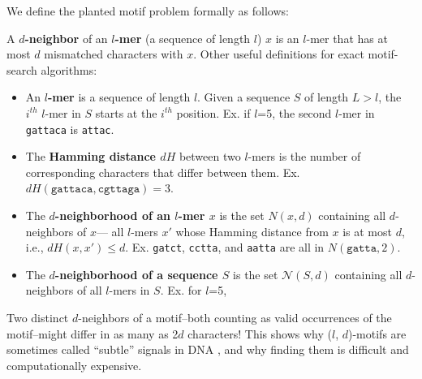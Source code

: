\documentclass{acm_proc_article-sp}
\begin{document}
	We define the planted motif problem formally as follows:

	\noindent

	A {\boldmath \textbf{$d$-neighbor} of an \textbf{$l$-mer}} (a sequence of length $l$) $x$ is an $l$-mer that has at most $d$ mismatched characters with $x$.  Other useful definitions for exact motif-search algorithms:
		\vspace{-3mm}
		\begin{itemize}
			\small
			\item An \textbf{\boldmath $l$-mer} is a sequence of length $l$.
			Given a sequence $S$ of length $L > l$, the $i^{th}$ $l$-mer in $S$ starts at the $i^{th}$ position.
			Ex. if $l$=5, the second $l$-mer in \texttt{gattaca} is \texttt{attac}.
	
			\item The \textbf{\boldmath Hamming distance $dH$} 
			between two $l$-mers is the number of corresponding characters that differ between them.
			Ex. $dH(\texttt{gattaca}, \texttt{cgttaga}) = 3$.
	
			\item The \textbf{\boldmath $d$-neighborhood of an $l$-mer $x$}
			is the set {\boldmath $N(x, d)$} containing all $d$-neighbors of $x$---
			all $l$-mers $x'$ whose Hamming distance from $x$ is at most $d$, i.e., {\boldmath $dH (x, x') \leq d$}.
			\newline Ex. \texttt{gatct}, \texttt{cctta}, and \texttt{aatta} are all in $N(\texttt{gatta}, 2)$.
	
			\item The \textbf{\boldmath $d$-neighborhood of a sequence $S$} %
			is the set {\boldmath $\mathcal{N}(S, d)$}
			\newline containing all $d$-neighbors of all $l$-mers in $S$. Ex. for $l$=5,
			
			\end{itemize}
			\vspace{-3mm}
	Two distinct $d$-neighbors of a motif--both counting as valid occurrences of the motif--might differ in as many as 2$d$ characters! This shows why ($l$, $d$)-motifs are sometimes called ``subtle'' signals in DNA  \cite{pevzner2000combinatorial}, and why finding them is difficult and computationally expensive.
\end{document}
